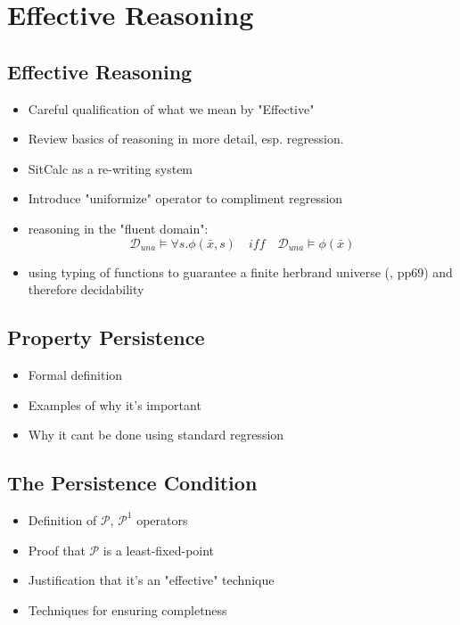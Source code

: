 \chapter{Effective Reasoning}\label{ch:reasoning}

\section{Effective Reasoning}

\begin{itemize}
\item Careful qualification of what we mean by "Effective"
\item Review basics of reasoning in more detail, esp. regression.
\item SitCalc as a re-writing system
\item Introduce "uniformize" operator to compliment regression
\item reasoning in the "fluent domain":
\begin{equation*}
\mathcal{D}_{una} \models \forall s. \phi(\bar{x},s)\,\,\,\,\,\,iff\,\,\,\,\,\,\mathcal{D}_{una} \models \phi(\bar{x})
\end{equation*}
\item using typing of functions to guarantee a finite herbrand universe (\cite{levesque04krr_book}, pp69) and therefore decidability
\end{itemize}

\section{Property Persistence}

\begin{itemize}
\item Formal definition
\item Examples of why it's important
\item Why it cant be done using standard regression
\end{itemize}

\section{The Persistence Condition}

\begin{itemize}
\item Definition of $\mathcal{P}$, $\mathcal{P}^{1}$ operators
\item Proof that $\mathcal{P}$ is a least-fixed-point
\item Justification that it's an "effective" technique
\item Techniques for ensuring completness
\end{itemize}

